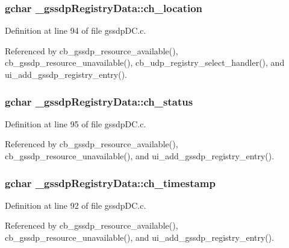 \subsubsection[{ch\+\_\+location}]{\setlength{\rightskip}{0pt plus 5cm}gchar \+\_\+gssdp\+Registry\+Data\+::ch\+\_\+location}\label{struct__gssdp_registry_data_ac1ca256d22c387e9ef968fb8413d7796}


Definition at line 94 of file gssdp\+D\+C.\+c.



Referenced by cb\+\_\+gssdp\+\_\+resource\+\_\+available(), cb\+\_\+gssdp\+\_\+resource\+\_\+unavailable(), cb\+\_\+udp\+\_\+registry\+\_\+select\+\_\+handler(), and ui\+\_\+add\+\_\+gssdp\+\_\+registry\+\_\+entry().

\hypertarget{struct__gssdp_registry_data_a92d851353d8779ad1c5dd4e540a956e5}{}
\subsubsection[{ch\+\_\+status}]{\setlength{\rightskip}{0pt plus 5cm}gchar \+\_\+gssdp\+Registry\+Data\+::ch\+\_\+status}\label{struct__gssdp_registry_data_a92d851353d8779ad1c5dd4e540a956e5}


Definition at line 95 of file gssdp\+D\+C.\+c.



Referenced by cb\+\_\+gssdp\+\_\+resource\+\_\+available(), cb\+\_\+gssdp\+\_\+resource\+\_\+unavailable(), and ui\+\_\+add\+\_\+gssdp\+\_\+registry\+\_\+entry().

\hypertarget{struct__gssdp_registry_data_a97c1fccf55465d4de2168be0d70e2707}{}
\subsubsection[{ch\+\_\+timestamp}]{\setlength{\rightskip}{0pt plus 5cm}gchar \+\_\+gssdp\+Registry\+Data\+::ch\+\_\+timestamp}\label{struct__gssdp_registry_data_a97c1fccf55465d4de2168be0d70e2707}


Definition at line 92 of file gssdp\+D\+C.\+c.



Referenced by cb\+\_\+gssdp\+\_\+resource\+\_\+available(), cb\+\_\+gssdp\+\_\+resource\+\_\+unavailable(), and ui\+\_\+add\+\_\+gssdp\+\_\+registry\+\_\+entry().

